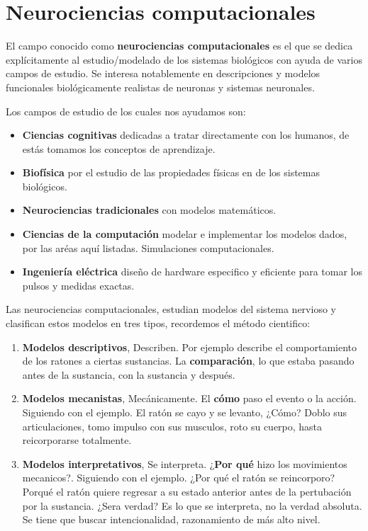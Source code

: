 \section{Neurociencias computacionales}

El campo conocido como \textbf{neurociencias computacionales}\cite{sonNC} es el que se dedica explícitamente al estudio/modelado de los sistemas biológicos con ayuda de varios campos de estudio. Se interesa notablemente en descripciones y modelos funcionales biológicamente realistas de neuronas y sistemas neuronales. 

Los campos de estudio de los cuales nos ayudamos son:
\begin{itemize}
 \item  \textbf{Ciencias cognitivas} dedicadas a tratar directamente con los humanos, de estás tomamos los conceptos de aprendizaje.
 \item  \textbf{Biofísica}  por el estudio de las propiedades físicas en de los sistemas biológicos. 
 \item  \textbf{Neurociencias tradicionales} con modelos matemáticos. 
 
 \item  \textbf{Ciencias de la computación} modelar e implementar los modelos dados, por las aréas aquí listadas. Simulaciones computacionales. 
 
 \item  \textbf{Ingeniería eléctrica} diseño de hardware especifico y eficiente para tomar los pulsos y medidas exactas.  
 
\end{itemize}

Las neurociencias computacionales, estudian modelos del sistema nervioso y clasifican estos modelos en tres tipos, recordemos el método cientifico: 

\begin{enumerate}
 \item \textbf{Modelos descriptivos}, Describen. Por ejemplo describe el comportamiento de los ratones a ciertas sustancias. La \textbf{comparación}, lo que estaba pasando antes de la sustancia, con la sustancia y después. 
  
 \item \textbf{Modelos mecanistas}, Mecánicamente. El \textbf{cómo} paso el evento o la acción. Siguiendo con el ejemplo. El ratón se cayo y se levanto, ¿Cómo? Doblo sus articulaciones, tomo impulso con sus musculos, roto su cuerpo, hasta reicorporarse totalmente.
 
 \item \textbf{Modelos interpretativos}, Se interpreta. ¿\textbf{Por qué} hizo los movimientos mecanicos?. Siguiendo con el ejemplo. ¿Por qué el ratón se reincorporo? Porqué el ratón quiere regresar a su estado anterior antes de la pertubación por la sustancia. ¿Sera verdad? Es lo que se interpreta, no la verdad absoluta. Se tiene que buscar intencionalidad, razonamiento de más alto nivel.
 
\end{enumerate}

